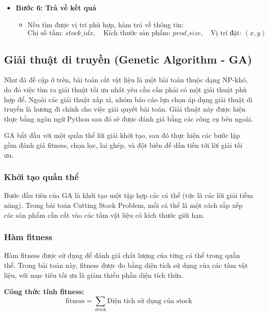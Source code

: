 \documentclass[a4paper]{article}
\begin{document}
\begin{itemize}
  \item \textbf{Bước 6: Trả về kết quả}
  \begin{itemize}
    \item Nếu tìm được vị trí phù hợp, hàm trả về thông tin:
    \[
    \text{Chỉ số tấm: } stock\_idx, \quad \text{Kích thước sản phẩm: } prod\_size, \quad \text{Vị trí đặt: } (x, y)
    \]
  \end{itemize}
\end{itemize}

\subsection{Giải thuật di truyền (Genetic Algorithm - GA)}

\hspace{11pt}
Như đã đề cập ở trên, bài toán cắt vật liệu là một bài toán thuộc dạng NP-khó, do đó việc tìm ra giải thuật tối ưu nhất yêu cầu cần phải có một giải thuật phù hợp để. Ngoài các giải thuật xấp xỉ, nhóm báo cáo lựa chọn áp dụng giải thuật di truyền là hương đi chính cho việc giải quyết bài toán. Giải thuật này được hiện thực bằng ngôn ngữ Python sau đó sẽ được đánh giá bằng các công cụ bên ngoài.

\hspace{11pt}
GA bắt đầu với một quần thể lời giải khởi tạo, sau đó thực hiện các bước lặp gồm đánh giá fitness, chọn lọc, lai ghép, và đột biến để dần tiến tới lời giải tối ưu.

\subsubsection{Khởi tạo quần thể}
\hspace{11pt}
Bước đầu tiên của GA là khởi tạo một tập hợp các cá thể (tức là các lời giải tiềm năng). Trong bài toán Cutting Stock Problem, mỗi cá thể là một cách sắp xếp các sản phẩm cần cắt vào các tấm vật liệu có kích thước giới hạn.


\subsubsection{Hàm fitness}
\hspace{11pt}
Hàm fitness được sử dụng để đánh giá chất lượng của từng cá thể trong quần thể. Trong bài toán này, fitness được đo bằng diện tích sử dụng của các tấm vật liệu, với mục tiêu tối ưu là giảm thiểu phần diện tích thừa.\newline

\textbf{Công thức tính fitness:}
\begin{equation}
\text{fitness} = \sum_{\text{stock}} \text{Diện tích sử dụng của stock}
\end{equation}
\end{document}
